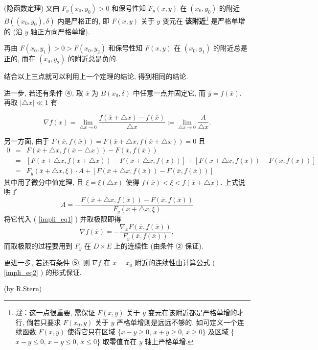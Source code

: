 \begin{theorem}{(隐函数定理)}
又由 $F_{y}(x_{0},y_{0})>0$ 和保号性知 $F_{y}(x,y)$ 在 $(x_{0},y_{0})$
的附近 $B((x_{0},y_{0}),\delta)$ 内是严格正的, 即 $F(x,y)$ 关于 $y$ 变元在 \textbf{该附近}\footnote{\textsl{注}：这一点很重要, 需保证 $F(x,y)$ 关于 $y$ 变元在该附近都是严格单增的才行, 倘若只要求 $F(x_{0},y)$
关于 $y$ 严格单增则是远远不够的. 如可定义一个连续函数 $F(x,y)$ 使得它只在区域 \{$x-y\geqslant0$,
$x+y\geqslant0$, $x\geqslant0$\} 及区域 \{$x-y\leqslant0$, $x+y\leqslant0$,
$x\leqslant0$\} 取零值而在 $y$ 轴上严格单增. } 是严格单增的 (沿 $y$ 轴正方向严格单增). 

再由 $F(x_{0},y_{1})>0>F(x_{0},y_{2})$ 和保号性知 $F(x,y)$ 在 $(x_{0},y_{1})$
的附近总是正的, 而在 $(x_{0},y_{2})$ 的附近总是负的. 

结合以上三点就可以利用上一个定理的结论, 得到相同的结论. 

进一步, 若还有条件 ④, 取 \textbf{$\overline{x}$ }为 $B(x_{0},\delta)$ 中任意一点并固定它,
而 $\overline{y}=f(\overline{x})$. 再取 $\left|\triangle x\right|\ll1$
有

\begin{equation}\label{impli_eq1}
\nabla f(x)={\displaystyle {\displaystyle \lim_{\triangle x\rightarrow0}}\frac{f(\overline{x}+\triangle x)-f(\overline{x})}{\triangle x}:={\displaystyle \lim_{\triangle x\rightarrow0}}\frac{A}{\triangle x}}.
\end{equation}

另一方面, 由于 $F(\overline{x},f(\overline{x}))=F(\overline{x}+\triangle x,f(\overline{x}+\triangle x))=0$
且
$$
\begin{eqnarray*}
0 & = & F(\overline{x}+\triangle x,f(\overline{x}+\triangle x))-F(\overline{x},f(\overline{x}))\\
 & = & \left[F(\overline{x}+\triangle x,f(\overline{x}+\triangle x))-F(\overline{x}+\triangle x,f(\overline{x}))\right]+\left[F(\overline{x}+\triangle x,f(\overline{x}))-F(\overline{x},f(\overline{x}))\right]\\
 & = & F_{y}(\overline{x}+\triangle x,\xi)\cdot A+\left[F(\overline{x}+\triangle x,f(\overline{x}))-F(\overline{x},f(\overline{x}))\right]
\end{eqnarray*}
$$
其中用了微分中值定理, 且 $\xi=\xi(\triangle x)$ 使得 $f(\overline{x})<\xi<f(\overline{x}+\triangle x)$.
上式说明了 
\[
A=-{\displaystyle \frac{F(\overline{x}+\triangle x,f(\overline{x}))-F(\overline{x},f(\overline{x}))}{F_{y}(\overline{x}+\triangle x,\xi)}}
\]
将它代入 ( \autoref{impli_eq1} ) 并取极限即得 
\begin{equation}\label{impli_eq2}
\nabla f(\overline{x})=-{\displaystyle \frac{\nabla_{x}F(\overline{x},f(\overline{x}))}{F_{y}(\overline{x},f(\overline{x}))},}
\end{equation}
而取极限的过程要用到 $F_{y}$ 在 $D\times E$ 上的连续性 (由条件 ② 保证). 

更进一步, 若还有条件 ⑤, 则 $\nabla f$ 在 $x=x_{0}$ 附近的连续性由计算公式 ( \autoref{impli_eq2} ) 的形式保证. 
 \end{theorem}

(by R.Stern)

